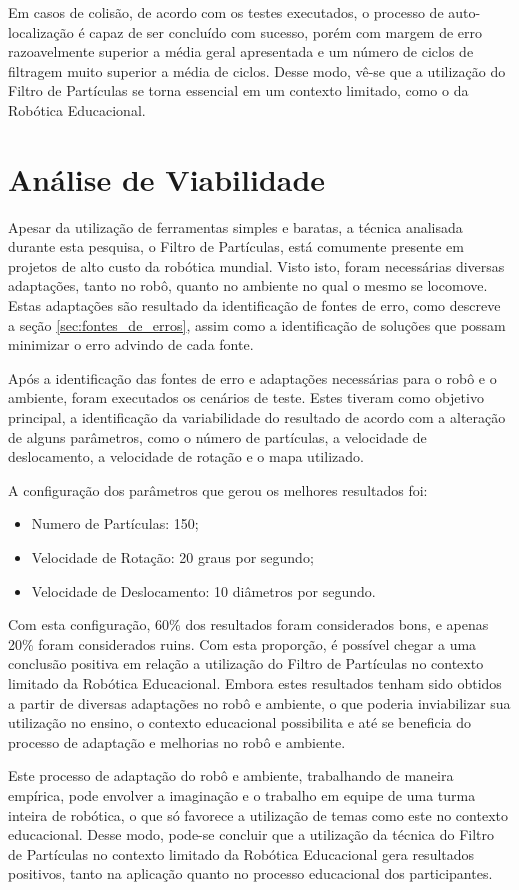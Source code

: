 Em casos de colisão, de acordo com os testes executados, o processo de auto-localização é capaz de ser concluído com sucesso, porém
com margem de erro razoavelmente superior a média geral apresentada e um número de ciclos de filtragem muito superior a média de ciclos. Desse modo,
vê-se que a utilização do Filtro de Partículas se torna essencial em um contexto limitado, como o da Robótica Educacional.

\section{Análise de Viabilidade}
\label{sec:viabilidade}

Apesar da utilização de ferramentas simples e baratas, a técnica analisada durante esta pesquisa, o Filtro de Partículas, está comumente
presente em projetos de alto custo da robótica mundial. Visto isto, foram necessárias diversas adaptações, tanto no robô, quanto no ambiente
no qual o mesmo se locomove. Estas adaptações são resultado da identificação de fontes de erro, como descreve a seção \ref{sec:fontes_de_erros},
assim como a identificação de soluções que possam minimizar o erro advindo de cada fonte.

Após a identificação das fontes de erro e adaptações necessárias para o robô e o ambiente, foram executados os cenários de teste. Estes tiveram como objetivo
principal, a identificação da variabilidade do resultado de acordo com a alteração de alguns parâmetros, como o número de partículas,
a velocidade de deslocamento, a velocidade de rotação e o mapa utilizado.

A configuração dos parâmetros que gerou os melhores resultados foi:

\begin{itemize}
  \item Numero de Partículas: 150;
  \item Velocidade de Rotação: 20 graus por segundo;
  \item Velocidade de Deslocamento: 10 diâmetros por segundo.
\end{itemize}

Com esta configuração, 60\% dos resultados foram considerados bons, e apenas 20\% foram considerados ruins. Com esta proporção, é possível
chegar a uma conclusão positiva em relação a utilização do Filtro de Partículas no contexto limitado da Robótica Educacional.
Embora estes resultados tenham sido obtidos a partir de diversas adaptações no robô e ambiente, o que poderia inviabilizar sua
utilização no ensino, o contexto educacional possibilita e até se beneficia do processo de adaptação e melhorias no robô e ambiente.

Este processo de adaptação do robô e ambiente, trabalhando de maneira empírica, pode envolver a imaginação e o trabalho em equipe
de uma turma inteira de robótica, o que só favorece a utilização de temas como este no contexto educacional. Desse modo, pode-se concluir
que a utilização da técnica do Filtro de Partículas no contexto limitado da Robótica Educacional gera resultados positivos, tanto
na aplicação quanto no processo educacional dos participantes.

